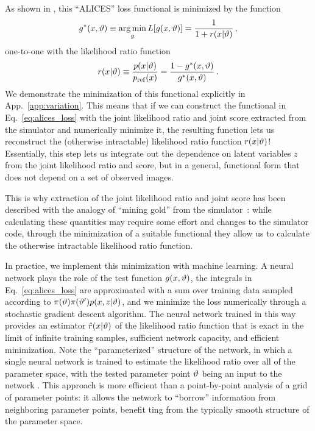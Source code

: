 \documentclass[twocolumn]{aastex62}
\begin{document}
As shown in \citet{Stoye:2018ovl}, this ``ALICES''
loss functional is minimized by the function
%
\begin{equation}
  g^*(x, \stattheta) \equiv \argmin_g L[g(x, \stattheta)] = \frac 1 {1 + r(x|\stattheta)} \,,
  \label{eq:loss_minimum}
\end{equation}
%
one-to-one with the likelihood ratio function
%
\begin{equation}
  r(x|\stattheta)
  \equiv \frac {p(x|\stattheta)} {p_\mathrm{ref}(x)}
  = \frac {1 - g^*(x, \stattheta)}{g^*(x, \stattheta)} \,.
\end{equation}
%
We demonstrate the minimization of this functional explicitly in App.~\ref{app:variation}. This means that if we can construct the functional in Eq.~\eqref{eq:alices_loss} with the joint likelihood ratio and joint score extracted from the simulator and numerically minimize it, the resulting function lets us reconstruct the (otherwise intractable) likelihood ratio function $r(x|\vartheta)$! Essentially, this step lets us integrate out the dependence on latent variables $z$ from the joint likelihood ratio and score, but in a general, functional form that does not depend on a set of observed images.

This is why extraction of the joint likelihood ratio and joint score has been described with the analogy of ``mining gold'' from the simulator~\citep{1805.12244}: while calculating these quantities may require some effort and changes to the simulator code, through the minimization of a suitable functional they allow us to calculate the otherwise intractable likelihood ratio function.

In practice, we implement this minimization with machine learning. A neural network plays the role of the test function $g(x, \vartheta)$, the integrals in Eq.~\eqref{eq:alices_loss} are approximated with a sum over training data sampled according to $\pi(\vartheta) \pi(\vartheta') p(x,z|\vartheta)$, and we minimize the loss numerically through a stochastic gradient descent algorithm. The neural network trained in this way provides an estimator $\hat{r}(x|\vartheta)$ of the likelihood ratio function that is exact in the limit of infinite training samples, sufficient network capacity, and efficient minimization. Note the ``parameterized'' structure of the network, in which a single neural network is trained to estimate the likelihood ratio over all of the parameter space, with the tested parameter point $\vartheta$ being an input to the network \citep{Cranmer:2015bka, Baldi:2016fzo}. This approach is more efficient than a point-by-point analysis of a grid of parameter points: it allows the network to ``borrow'' information from neighboring parameter points, benefit ting from the typically smooth structure of the parameter space.
\end{document}
